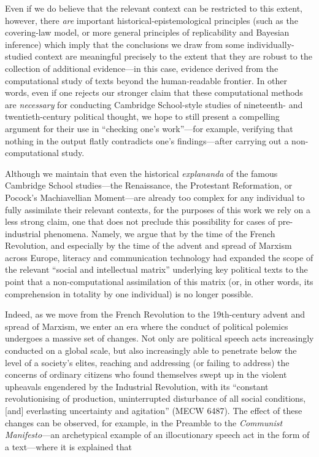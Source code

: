 \documentclass[11pt]{article}
\begin{document}
Even if we do believe that the relevant context can be restricted to this extent, however, there \textit{are} important historical-epistemological principles (such as the covering-law model, or more general principles of replicability and Bayesian inference) which imply that the conclusions we draw from some individually-studied context are meaningful precisely to the extent that they are robust to the collection of additional evidence---in this case, evidence derived from the computational study of texts beyond the human-readable frontier. In other words, even if one rejects our stronger claim that these computational methods are \textit{necessary} for conducting Cambridge School-style studies of nineteenth- and twentieth-century political thought, we hope to still present a compelling argument for their use in ``checking one's work''---for example, verifying that nothing in the output flatly contradicts one's findings---after carrying out a non-computational study.

Although we maintain that even the historical \textit{explananda} of the famous Cambridge School studies---the Renaissance, the Protestant Reformation, or Pocock's Machiavellian Moment---are already too complex for any individual to fully assimilate their relevant contexts, for the purposes of this work we rely on a less strong claim, one that does not preclude this possibility for cases of pre-industrial phenomena. Namely, we argue that by the time of the French Revolution, and especially by the time of the advent and spread of Marxism across Europe, literacy and communication technology had expanded the scope of the relevant ``social and intellectual matrix'' underlying key political texts to the point that a non-computational assimilation of this matrix (or, in other words, its comprehension in totality by one individual) is no longer possible.

Indeed, as we move from the French Revolution to the 19th-century advent and spread of Marxism, we enter an era where the conduct of political polemics undergoes a massive set of changes. Not only are political speech acts increasingly conducted on a global scale, but also increasingly able to penetrate below the level of a society's elites, reaching and addressing (or failing to address) the concerns of ordinary citizens who found themselves swept up in the violent upheavals engendered by the Industrial Revolution, with its ``constant revolutionising of production, uninterrupted disturbance of all social conditions, [and] everlasting uncertainty and agitation'' (MECW {6}{487}). The effect of these changes can be observed, for example, in the Preamble to the \textit{Communist Manifesto}---an archetypical example of an illocutionary speech act in the form of a text---where it is explained that
\end{document}
